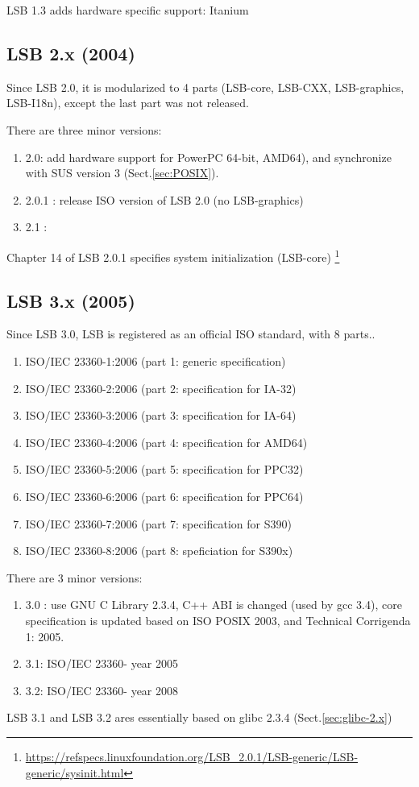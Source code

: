 LSB 1.3 adds hardware specific support: Itanium

\subsection{LSB 2.x (2004)}

Since LSB 2.0, it is  modularized to 4 parts (LSB-core, LSB-CXX, LSB-graphics,
LSB-I18n), except the last part was not released. 

There are three minor versions:
\begin{enumerate}
  \item 2.0: add hardware support for PowerPC 64-bit, AMD64), and synchronize with SUS version 3
(Sect.\ref{sec:POSIX}).
  \item 2.0.1 : release ISO version of LSB 2.0 (no LSB-graphics)
  \item 2.1 : 
\end{enumerate}

Chapter 14 of LSB 2.0.1 specifies system initialization (LSB-core)
\footnote{\url{https://refspecs.linuxfoundation.org/LSB_2.0.1/LSB-generic/LSB-generic/sysinit.html}}

\subsection{LSB 3.x (2005)}
\label{sec:LSB_3.1}
\label{sec:LSB_3.x}

Since LSB 3.0, LSB is registered as an official ISO standard, with 8 parts..
\begin{enumerate}
  \item ISO/IEC 23360-1:2006 (part 1: generic specification)
  \item ISO/IEC 23360-2:2006 (part 2: specification for IA-32)
  \item ISO/IEC 23360-3:2006 (part 3: specification for IA-64)
  \item ISO/IEC 23360-4:2006 (part 4: specification for AMD64)
  \item ISO/IEC 23360-5:2006 (part 5: specification for PPC32)
  \item ISO/IEC 23360-6:2006 (part 6: specification for PPC64)
  \item ISO/IEC 23360-7:2006 (part 7: specification for S390)
  \item ISO/IEC 23360-8:2006 (part 8: speficiation for S390x)       
\end{enumerate}


There are 3 minor versions:
\begin{enumerate}
  \item 3.0 : use GNU C Library 2.3.4, C++ ABI is changed (used by gcc 3.4),
  core specification is updated based on ISO POSIX 2003, and Technical
  Corrigenda 1: 2005.
  
  \item 3.1: ISO/IEC 23360- year 2005
  \item 3.2: ISO/IEC 23360- year 2008
\end{enumerate}
LSB 3.1 and LSB 3.2 ares essentially based on glibc 2.3.4
(Sect.\ref{sec:glibc-2.x})


